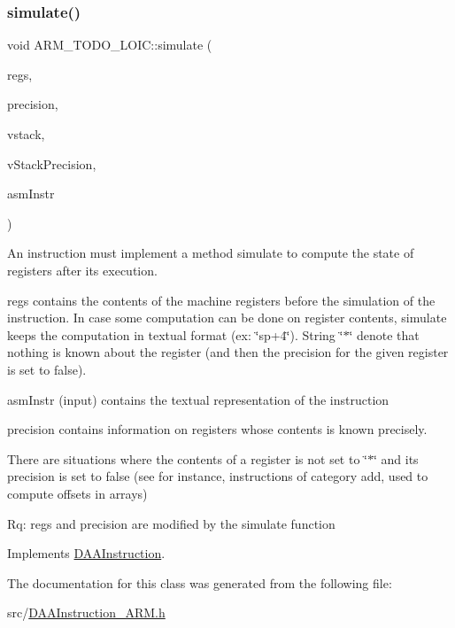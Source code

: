 \subsubsection{\texorpdfstring{simulate()}{simulate()}}
{\footnotesize\ttfamily void A\+R\+M\+\_\+\+T\+O\+D\+O\+\_\+\+L\+O\+I\+C\+::simulate (\begin{DoxyParamCaption}\item[{\hyperlink{DAAInstruction_8h_af0fae93a861de9cf37988d5673cac523}{reg\+Table} \&}]{regs,  }\item[{\hyperlink{DAAInstruction_8h_a0e8cae02815a5f8adc750122d790b455}{reg\+Precision\+Table} \&}]{precision,  }\item[{\hyperlink{DAAInstruction_8h_a1b0e70ac1a04f06c8132055ed01f589f}{stack\+Type} \&}]{vstack,  }\item[{\hyperlink{DAAInstruction_8h_ac5cb793e9dac3fa9693da78b7e29ab30}{stack\+Prec\+Type} \&}]{v\+Stack\+Precision,  }\item[{const string \&}]{asm\+Instr }\end{DoxyParamCaption})\hspace{0.3cm}{\ttfamily [virtual]}}

An instruction must implement a method simulate to compute the state of registers after its execution.

regs contains the contents of the machine registers before the simulation of the instruction. In case some computation can be done on register contents, simulate keeps the computation in textual format (ex\+: \char`\"{}sp+4\char`\"{}). String \char`\"{}$\ast$\char`\"{} denote that nothing is known about the register (and then the precision for the given register is set to false).

asm\+Instr (input) contains the textual representation of the instruction

precision contains information on registers whose contents is known precisely.

There are situations where the contents of a register is not set to \char`\"{}$\ast$\char`\"{} and its precision is set to false (see for instance, instructions of category add, used to compute offsets in arrays)

Rq\+: regs and precision are modified by the simulate function 

Implements \hyperlink{classDAAInstruction_a61d0b9bece1e0ead89a46c0197276324}{D\+A\+A\+Instruction}.



The documentation for this class was generated from the following file\+:\begin{DoxyCompactItemize}
\item 
src/\hyperlink{DAAInstruction__ARM_8h}{D\+A\+A\+Instruction\+\_\+\+A\+R\+M.\+h}\end{DoxyCompactItemize}
